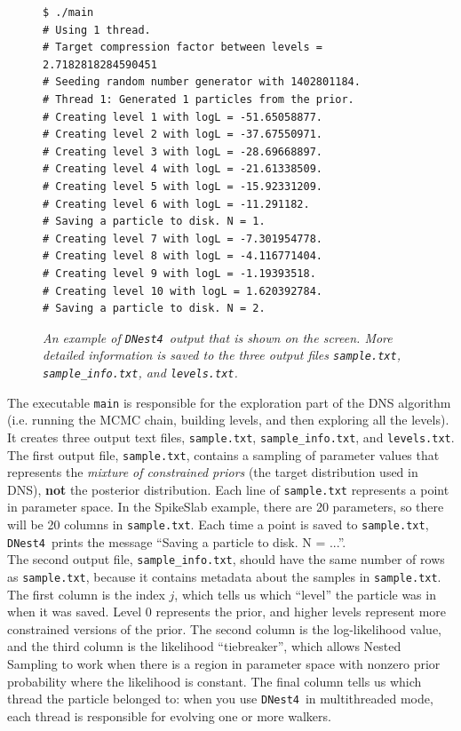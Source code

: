 \documentclass[a4paper, 11pt]{article}
\newcommand{\dnest}{{\tt DNest4}}
\begin{document}
\begin{figure}[h!]
\begin{framed}
\begin{verbatim}
$ ./main
# Using 1 thread.
# Target compression factor between levels = 2.7182818284590451
# Seeding random number generator with 1402801184.
# Thread 1: Generated 1 particles from the prior.
# Creating level 1 with logL = -51.65058877.
# Creating level 2 with logL = -37.67550971.
# Creating level 3 with logL = -28.69668897.
# Creating level 4 with logL = -21.61338509.
# Creating level 5 with logL = -15.92331209.
# Creating level 6 with logL = -11.291182.
# Saving a particle to disk. N = 1.
# Creating level 7 with logL = -7.301954778.
# Creating level 8 with logL = -4.116771404.
# Creating level 9 with logL = -1.19393518.
# Creating level 10 with logL = 1.620392784.
# Saving a particle to disk. N = 2.
\end{verbatim}
\end{framed}
\caption{\it An example of \dnest~output that is shown on the screen. More
detailed information is saved to the three output files
{\tt sample.txt}, {\tt sample\_info.txt}, and {\tt levels.txt}.
\label{fig:output}}
\end{figure}

The executable {\tt main} is responsible for the exploration part of the
DNS algorithm (i.e. running the MCMC chain, building
levels, and then exploring all the levels). It creates three output text files,
{\tt sample.txt}, {\tt sample\_info.txt}, and {\tt levels.txt}.\\

The first output
file, {\tt sample.txt}, contains a sampling of parameter values that
represents the {\it mixture of constrained priors} (the target distribution
used in DNS), {\bf not} the
posterior distribution. Each line of {\tt sample.txt} represents a point in
parameter space. In the SpikeSlab example, there are 20 parameters, so there
will be 20 columns in {\tt sample.txt}.
Each time a point is saved to {\tt sample.txt}, \dnest~prints
the message ``Saving a particle to disk. N = ...''.\\

The second output file, {\tt sample\_info.txt}, should have the same number of
rows as {\tt sample.txt}, because it contains metadata about the samples in
{\tt sample.txt}. The first
column is the index $j$, which tells us which ``level'' the particle was in
when it was saved. Level 0 represents the prior, and higher levels represent
more constrained versions of the prior.
The second column is the log-likelihood value, and the third column is
the likelihood ``tiebreaker'', which allows Nested Sampling to work when
there is a region in parameter space with nonzero prior probability where the
likelihood is constant. The final column tells us which thread the particle
belonged to: when you use \dnest~in multithreaded mode, each thread
is responsible for evolving one or more walkers.\\
\end{document}
